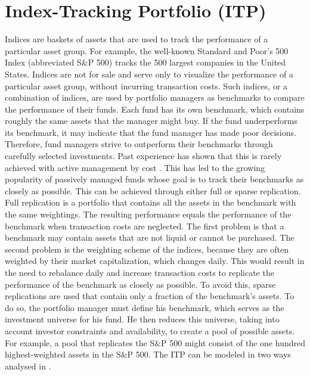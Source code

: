 \documentclass[
  oneside, a4paper, 12pt, openany]{book}
\theoremstyle{definition}
\theoremstyle{definition}
\theoremstyle{definition}
\theoremstyle{definition}
\theoremstyle{remark}
\begin{document}
\hypertarget{index-tracking-portfolio-itp}{%
\section{Index-Tracking Portfolio (ITP)}\label{index-tracking-portfolio-itp}}

Indices are baskets of assets that are used to track the performance of a particular asset group. For example, the well-known Standard and Poor's 500 Index (abbreviated S\&P 500) tracks the 500 largest companies in the United States. Indices are not for sale and serve only to visualize the performance of a particular asset group, without incurring transaction costs. Such indices, or a combination of indices, are used by portfolio managers as benchmarks to compare the performance of their funds. Each fund has its own benchmark, which contains roughly the same assets that the manager might buy. If the fund underperforms its benchmark, it may indicate that the fund manager has made poor decisions. Therefore, fund managers strive to outperform their benchmarks through carefully selected investments. Past experience has shown that this is rarely achieved with active management by cost \citep{Desm2016}. This has led to the growing popularity of passively managed funds whose goal is to track their benchmarks as closely as possible. This can be achieved through either full or sparse replication. Full replication is a portfolio that contains all the assets in the benchmark with the same weightings. The resulting performance equals the performance of the benchmark when transaction costs are neglected. The first problem is that a benchmark may contain assets that are not liquid or cannot be purchased. The second problem is the weighting scheme of the indices, because they are often weighted by their market capitalization, which changes daily. This would result in the need to rebalance daily and increase transaction costs to replicate the performance of the benchmark as closely as possible. To avoid this, sparse replications are used that contain only a fraction of the benchmark's assets. To do so, the portfolio manager must define his benchmark, which serves as the investment universe for his fund. He then reduces this universe, taking into account investor constraints and availability, to create a pool of possible assets. For example, a pool that replicates the S\&P 500 might consist of the one hundred highest-weighted assets in the S\&P 500. The ITP can be modeled in two ways analysed in \citep{IuGa2019}.
\end{document}
